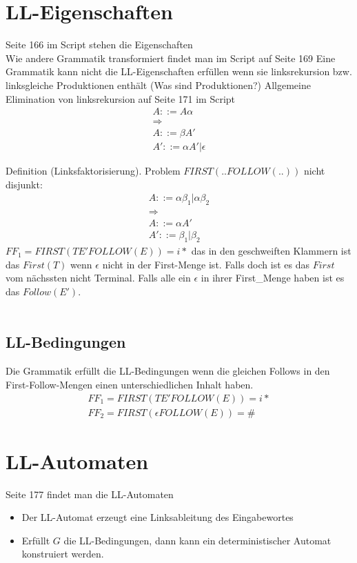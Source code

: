 \documentclass[
  ngerman
  ,12pt
  ,pdftex
]{article}
\begin{document}
\section{LL-Eigenschaften}
Seite 166 im Script stehen die Eigenschaften \\
Wie andere Grammatik transformiert findet man im Script auf Seite 169
Eine Grammatik kann nicht die LL-Eigenschaften erfüllen wenn sie linksrekursion bzw. linksgleiche Produktionen enthält (Was sind Produktionen?)
Allgemeine Elimination von linksrekursion auf Seite 171 im Script
\begin{align*}
    A::= A \alpha \\
    \Longrightarrow \\
    A::= \beta A' \\
    A'::=\alpha A' | \epsilon
\end{align*}

Definition (Linksfaktorisierung). Problem $FIRST(..FOLLOW(..))$ nicht disjunkt:
\begin{align*}
  A::=\alpha \beta_1  |  \alpha \beta_2 \\
  \Longrightarrow\\
  A::= \alpha A'\\
  A'::= \beta_1  |  \beta_2
\end{align*}
$FF_1 = FIRST(T E' FOLLOW(E))={i*}$ das in den geschweiften Klammern ist das $First(T)$ wenn $\epsilon$ nicht in der First-Menge ist. 
Falls doch ist es das $First$ vom nächssten nicht Terminal. 
Falls alle ein $\epsilon$ in ihrer First\_Menge haben ist es das $Follow(E')$.\\
\\
\subsection*{LL-Bedingungen}
Die Grammatik erfüllt die LL-Bedingungen wenn die gleichen Follows in den First-Follow-Mengen einen unterschiedlichen Inhalt haben.
\begin{align*}
  FF_1 = FIRST(T E' FOLLOW(E))={i*}\\
  FF_2 = FIRST(\epsilon FOLLOW(E))={\#}
\end{align*}



\section{LL-Automaten}
Seite 177 findet man die LL-Automaten \\
\begin{itemize}
  \item Der LL-Automat erzeugt eine Linksableitung des Eingabewortes
  \item Erfüllt $G$ die LL-Bedingungen, dann kann ein deterministischer Automat konstruiert werden.
\end{itemize}
\end{document}

